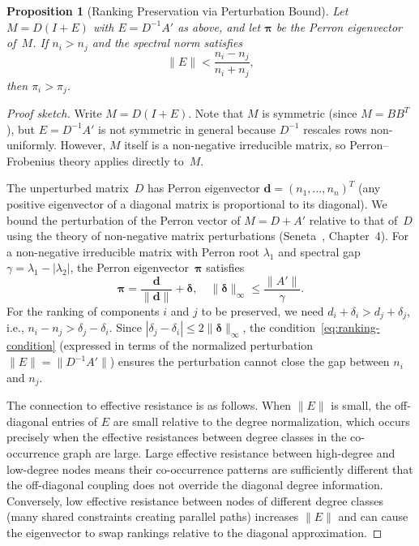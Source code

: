 \documentclass[11pt,a4paper]{article}
\newtheorem{proposition}[theorem]{Proposition}
\begin{document}
\begin{proposition}[Ranking Preservation via Perturbation Bound]\label{prop:resistance-ranking}
Let $M = D(I + E)$ with $E = D^{-1}A'$ as above, and let $\boldsymbol{\pi}$ be the Perron eigenvector of~$M$.
If $n_i > n_j$ and the spectral norm satisfies
\begin{equation}\label{eq:ranking-condition}
  \|E\| < \frac{n_i - n_j}{n_i + n_j},
\end{equation}
then $\pi_i > \pi_j$.
\end{proposition}

\begin{proof}[Proof sketch]
Write $M = D(I + E)$.
Note that $M$ is symmetric (since $M = BB^T$), but $E = D^{-1}A'$ is not symmetric in general because $D^{-1}$ rescales rows non-uniformly.
However, $M$ itself is a non-negative irreducible matrix, so Perron--Frobenius theory applies directly to~$M$.

The unperturbed matrix~$D$ has Perron eigenvector $\mathbf{d} = (n_1, \ldots, n_n)^T$ (any positive eigenvector of a diagonal matrix is proportional to its diagonal).
We bound the perturbation of the Perron vector of $M = D + A'$ relative to that of~$D$ using the theory of non-negative matrix perturbations (Seneta~\cite{seneta2006}, Chapter~4).
For a non-negative irreducible matrix with Perron root $\lambda_1$ and spectral gap $\gamma = \lambda_1 - |\lambda_2|$, the Perron eigenvector~$\boldsymbol{\pi}$ satisfies
\[
  \boldsymbol{\pi} = \frac{\mathbf{d}}{\|\mathbf{d}\|} + \boldsymbol{\delta}, \quad \|\boldsymbol{\delta}\|_\infty \leq \frac{\|A'\|}{\gamma}.
\]
For the ranking of components $i$ and $j$ to be preserved, we need $d_i + \delta_i > d_j + \delta_j$, i.e., $n_i - n_j > \delta_j - \delta_i$.
Since $|\delta_j - \delta_i| \leq 2\|\boldsymbol{\delta}\|_\infty$, the condition~\eqref{eq:ranking-condition} (expressed in terms of the normalized perturbation $\|E\| = \|D^{-1}A'\|$) ensures the perturbation cannot close the gap between $n_i$ and $n_j$.

The connection to effective resistance is as follows.
When $\|E\|$ is small, the off-diagonal entries of $E$ are small relative to the degree normalization, which occurs precisely when the effective resistances between degree classes in the co-occurrence graph are large.
Large effective resistance between high-degree and low-degree nodes means their co-occurrence patterns are sufficiently different that the off-diagonal coupling does not override the diagonal degree information.
Conversely, low effective resistance between nodes of different degree classes (many shared constraints creating parallel paths) increases $\|E\|$ and can cause the eigenvector to swap rankings relative to the diagonal approximation.
\end{proof}
\end{document}
